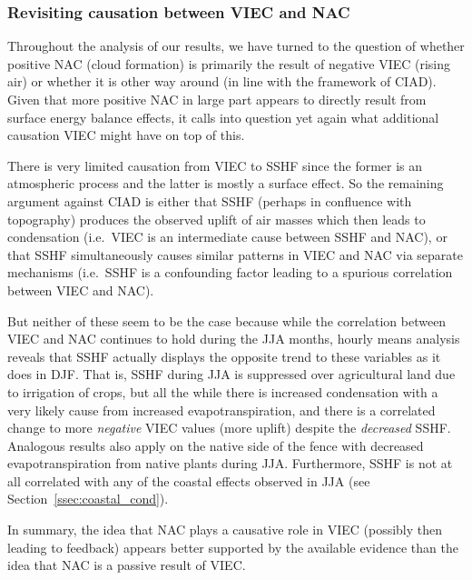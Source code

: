 \subsubsection{Revisiting causation between VIEC and NAC}

Throughout the analysis of our results, we have turned to the question of whether positive \ac{NAC} (cloud formation) is primarily the result of negative \ac{VIEC} (rising air) or whether it is other way around (in line with the framework of \ac{CIAD}). Given that more positive \ac{NAC} in large part appears to directly result from surface energy balance effects, it calls into question yet again what additional causation \ac{VIEC} might have on top of this.

There is very limited causation from \ac{VIEC} to \ac{SSHF} since the former is an atmospheric process and the latter is mostly a surface effect. So the remaining argument against \ac{CIAD} is either that \ac{SSHF} (perhaps in confluence with topography) produces the observed uplift of air masses which then leads to condensation (i.e.\ \ac{VIEC} is an intermediate cause between \ac{SSHF} and \ac{NAC}), or that \ac{SSHF} simultaneously causes similar patterns in \ac{VIEC} and \ac{NAC} via separate mechanisms (i.e.\ \ac{SSHF} is a confounding factor leading to a spurious correlation between \ac{VIEC} and \ac{NAC}).

But neither of these seem to be the case because while the correlation between \ac{VIEC} and \ac{NAC} continues to hold during the \ac{JJA} months, hourly means analysis reveals that \ac{SSHF} actually displays the opposite trend to these variables as it does in \ac{DJF}. That is, \ac{SSHF} during \ac{JJA} is suppressed over agricultural land due to irrigation of crops, but all the while there is increased condensation with a very likely cause from increased evapotranspiration, and there is a correlated change to more \textit{negative} \ac{VIEC} values (more uplift) despite the \textit{decreased} \ac{SSHF}. Analogous results also apply on the native side of the fence with decreased evapotranspiration from native plants during \ac{JJA}. Furthermore, \ac{SSHF} is not at all correlated with any of the coastal effects observed in \ac{JJA} (see Section~\ref{ssec:coastal_cond}).

In summary, the idea that \ac{NAC} plays a causative role in \ac{VIEC} (possibly then leading to feedback) appears better supported by the available evidence than the idea that \ac{NAC} is a passive result of \ac{VIEC}.

